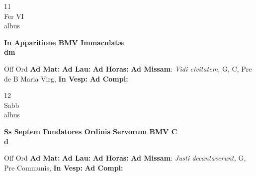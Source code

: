 \documentclass[10pt, openany]{book}
\begin{document}
        \begin{center}
            \begin{minipage}{3.5in}
                \vspace{2em}
                \begin{minipage}{0.5in}
                    {\Huge 11} \\
                    {\normalsize Fer VI} \\
                    {\normalsize albus}
                \end{minipage}
                \begin{minipage}{3.0in}
                    \textbf{ \large In Apparitione BMV Immaculatæ \\
                    \textnormal{\normalsize dm}} \\ 
                \end{minipage}
                \begin{justify}Off Ord
                    \textbf{Ad Mat: }
                    \textbf{Ad Lau: }
                    \textbf{Ad Horas: }\textbf{Ad Missam}: \textit{Vidi civitatem,} G, C, Pre de B Maria Virg,  
                    \textbf{In Vesp: }
                    \textbf{Ad Compl: }
                \end{justify}
            \end{minipage}
        \end{center}
    
        \begin{center}
            \begin{minipage}{3.5in}
                \vspace{2em}
                \begin{minipage}{0.5in}
                    {\Huge 12} \\
                    {\normalsize Sabb} \\
                    {\normalsize albus}
                \end{minipage}
                \begin{minipage}{3.0in}
                    \textbf{ \large Ss Septem Fundatores Ordinis Servorum BMV C \\
                    \textnormal{\normalsize d}} \\ 
                \end{minipage}
                \begin{justify}Off Ord
                    \textbf{Ad Mat: }
                    \textbf{Ad Lau: }
                    \textbf{Ad Horas: }\textbf{Ad Missam}: \textit{Justi decantaverunt,} G, Pre Communis,  
                    \textbf{In Vesp: }
                    \textbf{Ad Compl: }
                \end{justify}
            \end{minipage}
        \end{center}
    
\end{document}
